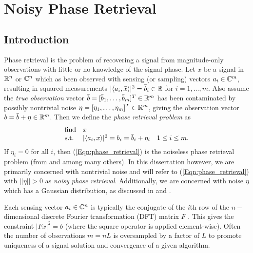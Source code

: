 \chapter{Noisy Phase Retrieval} 	\label{Sec:phase_retrieval}


\section{Introduction}	\label{Subsec:phase_retrieval-math_model}



Phase retrieval is the problem of recovering a signal from magnitude-only observations with little or no knowledge of the signal phase.  Let $\bar{x}$ be a signal in ${\mathbb R}^n$ or ${\mathbb C}^n$ which as been observed with sensing (or sampling) vectors $a_i \in {\mathbb C}^m$, resulting in squared measurements $|\langle a_i, \bar{x} \rangle |^2 = \bar{b}_i \in {\mathbb R}$ for $i = 1, \ldots, m$.  Also assume the \textit{true observation} vector $\bar{b} = [\bar{b}_1, \ldots, \bar{b}_m]^T \in {\mathbb R}^m$ has been contaminated by possibly nontrivial noise $\eta = [\eta_1, \ldots, \eta_m]^T \in {\mathbb R}^m$, giving the observation vector $b = \bar{b} + \eta \in {\mathbb R}^m$.  Then we define the \textit{phase retrieval problem} as
\begin{equation} \label{Eqn:phase_retrieval}
\begin{array}{lll}
\textnormal{find}		&	x		\\
\textnormal{s.t.}				&	|\langle a_i, x \rangle|^2 = b_i = \bar{b}_i + \eta_i	&	1 \leq i \leq m.
\end{array}
\end{equation}
If $\eta_i = 0$ for all $i$, then (\ref{Eqn:phase_retrieval}) is the noiseless phase retrieval problem (from \cite{Fienup82} and  \cite{DBLP:journals/tit/CandesLS15} among many others).  In this dissertation however, we are primarily concerned with nontrivial noise and will refer to (\ref{Eqn:phase_retrieval}) with $||\eta|| > 0$ as \textit{noisy phase retrieval}.  Additionally, we are concerned with noise $\eta$ which has a Gaussian distribution, as discussed in \cite{DBLP:journals/siamis/CandesESV13} and \cite{DBLP:journals/siamsc/FriedlanderM16}.


Each sensing vector $a_i \in {\mathbb C}^n$ is typically the conjugate of the $i$th row of the $n-$dimensional discrete Fourier transformation (DFT) matrix $F$ \cite[Chapter 11]{bracewell1986fourier}.  This gives the constraint $|Fx|^2 = b$ (where the square operator is applied element-wise).  Often the number of observations $m = nL$ is oversampled by a factor of $L$ to promote uniqueness of a signal solution and convergence of a given algorithm.  

